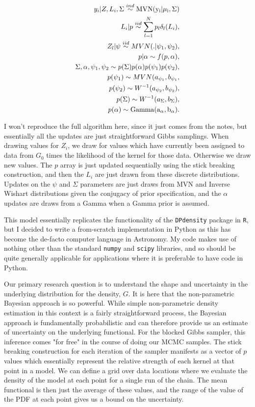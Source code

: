 \documentclass{article}
\begin{document}
\begin{eqnarray}
y_i | Z,L_i, \Sigma \stackrel{ind}{\sim} \rm{MVN}(y_i | \mu_i,\Sigma) \\
L_i | p \stackrel{iid}\sim \sum^{N}_{l=1}p_l\delta_l(L_i),\\
Z_l | \psi \stackrel{iid}\sim MVN(. | \psi_1,\psi_2), \\
p | \alpha \sim f(p,\alpha),\\
\Sigma,\alpha,\psi_1,\psi_2 \sim p(\Sigma)p(\alpha)p(\psi_1)p(\psi_2),\\
p(\psi_1) \sim MVN (a_{\psi_1},b_{\psi_1},\\
p(\psi_2) \sim W^{-1}(a_{\psi_2},b_{\psi_2}),\\
p(\Sigma) \sim W^{-1}(a_{\Sigma},b_{\Sigma}),\\
p(\alpha) \sim \rm{Gamma}(a_\alpha,b_\alpha).
\end{eqnarray}

I won't reproduce the full algorithm here, since it just comes from the notes, but essentially all the updates are just
straightforward Gibbs samplings. When drawing values for $Z_i$, we draw for values which have currently been
assigned to data from $G_0$ times the likelihood of the kernel for those data. Otherwise we draw new values.
The $p$ array is just updated sequentially using the stick breaking construction, and then the $L_i$ are just drawn
from these discrete distributions. Updates on the $\psi$ and $\Sigma$ parameters are just draws from MVN and Inverse
Wishart distributions given the conjugacy of prior specification, and the $\alpha$ updates are draws from a Gamma when
a Gamma prior is assumed.

This model essentially replicates the functionality of the \texttt{DPdensity} package in \texttt{R}, but
I decided to write a from-scratch implementation in Python as this has become the de-facto computer
language in Astronomy. My code makes use of nothing other than the standard \texttt{numpy} and
\texttt{scipy} libraries, and so should be quite generally applicable for applications where it is preferable to have
code in Python.

Our primary research question is to understand the shape and uncertainty in the underlying distribution for the density,
$G$. It is here that the non-parametric Bayesian approach is so powerful. While simple non-parametric
density estimation in this context
is a fairly straightforward process, the Bayesian approach is fundamentally probabilistic and can therefore provide us
an estimate of uncertainty on the underlying functional. For the blocked Gibbs sampler, this inference comes "for free"
in the course of doing our MCMC samples. The stick breaking construction for each iteration of the sampler manifests
as a vector of $p$ values which essentially represent the relative strength of each kernel at that point in a model.
We can define a grid over data locations where we evaluate the density of the model at each point for a single
run of the chain. The mean functional is then just the average of these values, and the range of the value of the PDF
at each point gives us a bound on the uncertainty. 
\end{document}
